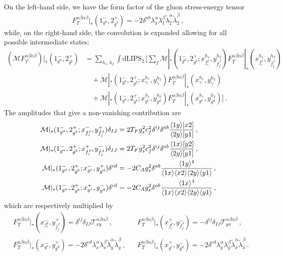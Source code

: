 \begin{subappendices}
On the left-hand side, we have the form factor of the gluon stress-energy tensor
\begin{equation}
    F_T^{\alpha\beta\dot\alpha\dot\beta}|_{*}(1^-_{g^a},2^+_{g^b}) = -2 \delta^{ab} \lambda_1^\alpha \lambda_1^\beta \widetilde\lambda_2^{\dot\alpha} \widetilde\lambda_2^{\dot\beta}\,,
\end{equation}
while, on the right-hand side, the convolution is expanded allowing for all possible
intermediate states:
\begin{align}
    (\mathcal M F_T^{\alpha\beta\dot\alpha\dot\beta})|_{*}(1^-_{g^a},2^+_{g^b}) &= \sum_{h_1,h_2}\int \text{dLIPS}_2\,
    \bigg[
    \sum_f  \mathcal M|_{*} (1^-_{g^a},2^+_{g^b}; x_{f_i^I}^{h_1},y_{\bar f_j^J}^{h_2})F_T^{\alpha\beta\dot\alpha\dot\beta}|_{*}(x_{f_i^I}^{h_1},y_{\bar f_j^J}^{h_2})\nonumber \\
    &\quad + \mathcal M|_{*} (1^-_{g^a},2^+_{g^b}; x_\gamma^{h_1},y_\gamma^{h_2})F_T^{\alpha\beta\dot\alpha\dot\beta}|_{*}(x_\gamma^{h_1},y_\gamma^{h_2})\nonumber \\
    &\quad + \mathcal M|_{*} (1^-_{g^a},2^+_{g^b}; x_{g^c}^{h_1},y_{g^d}^{h_2})F_T^{\alpha\beta\dot\alpha\dot\beta}|_{*}(x_{g^c}^{h_1},y_{g^d}^{h_2})
    \bigg]\,.
\end{align}
The amplitudes that give a non-vanishing contribution are
\begin{align}
    \mathcal M|_*(1^-_{g^a},2^+_{g^b};x_{f_i^I}^{-},y_{\bar f_j^J}^{+})\delta_{IJ} &= 2T_Fg_s^2c_f^2\delta^{ij}\delta^{ab}\frac{\langle 1 y \rangle\lbrack x 2 \rbrack}{\langle 2 y \rangle\lbrack y 1 \rbrack}\,, \\
    \mathcal M|_*(1^-_{g^a},2^+_{g^b};x_{f_i^I}^{+},y_{\bar f_j^J}^{-})\delta_{IJ} &= 2T_Fg_s^2c_f^2\delta^{ij}\delta^{ab}\frac{\langle 1 x \rangle\lbrack y 2 \rbrack}{\langle 2 y \rangle\lbrack y 1 \rbrack}\,,\\
    \mathcal M|_* (1^-_{g^a},2^+_{g^b};x_{g^c}^{-},y_{g^d}^{+}) \delta^{cd} &= -2C_A g_s^2\delta^{ab}\frac{\langle 1 y \rangle^4}{\langle 1 x \rangle\langle x 2 \rangle\langle 2 y \rangle\langle y 1 \rangle}\,, \\
    \mathcal M|_* (1^-_{g^a},2^+_{g^b};x_{g^c}^{+},y_{g^d}^{-}) \delta^{cd} &= -2C_A g_s^2\delta^{ab}\frac{\langle 1 x \rangle^4}{\langle 1 x \rangle\langle x 2 \rangle\langle 2 y \rangle\langle y 1 \rangle}\,,
\end{align}
which are respectively multiplied by
\begin{align}
&
F_T^{\alpha\beta\dot\alpha\dot\beta}|_{*}(x_{f_i^I}^{-},y_{\bar f_j^J}^{+}) = \delta^{ij}\delta_{IJ}\mathcal{T}_{xy}^{\alpha\beta\dot{\alpha}\dot{\beta}}\,,
\qquad & &
F_T^{\alpha\beta\dot\alpha\dot\beta}|_{*}(x_{f_i^I}^{+},y_{\bar f_j^J}^{-}) = -\delta^{ij}\delta_{IJ}\mathcal{T}_{yx}^{\alpha\beta\dot{\alpha}\dot{\beta}}\,,
\\
&
F_T^{\alpha\beta\dot\alpha\dot\beta}|_{*}(x_{g^c}^{-},y_{g^d}^{+}) = -2\delta^{cd}\lambda_x^\alpha \lambda_x^\beta \widetilde\lambda_y^{\dot\alpha} \widetilde\lambda_y^{\dot\beta}\,,
& & F_T^{\alpha\beta\dot\alpha\dot\beta}|_{*}(x_{g^c}^{+},y_{g^d}^{-}) = -2\delta^{cd}\lambda_y^\alpha \lambda_y^\beta \widetilde\lambda_x^{\dot\alpha} \widetilde\lambda_x^{\dot\beta}\,.
\end{align}


\end{subappendices}
